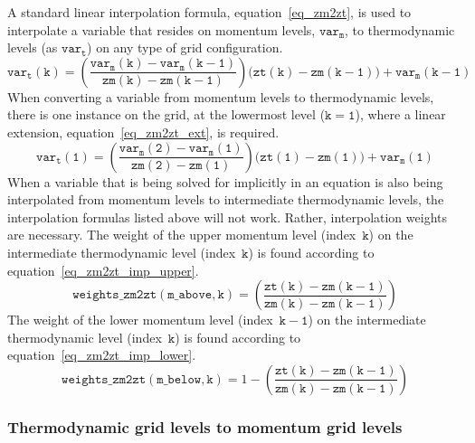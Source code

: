 \documentclass[11pt,fleqn]{article}
\begin{document}
A standard linear interpolation formula, equation~\ref{eq_zm2zt}, is used to 
interpolate a variable that resides on momentum levels, $\mathtt{var_m}$, to 
thermodynamic levels (as $\mathtt{var_t}$) on any type of grid configuration.
\begin{equation}
\label{eq_zm2zt}
\mathtt{var_t(k)}
   = \left( \frac{ \mathtt{var_m(k)} - \mathtt{var_m(k-1)} }
                 { \mathtt{zm(k)} - \mathtt{zm(k-1)} } \right)
     \Big( \mathtt{zt(k)} - \mathtt{zm(k-1)} \Big)
     + \mathtt{var_m(k-1)}
\end{equation}
When converting a variable from momentum levels to thermodynamic levels, there
is one instance on the grid, at the lowermost level ($\mathtt{k=1}$), where 
a linear extension, equation~\ref{eq_zm2zt_ext}, is required.
\begin{equation}
\label{eq_zm2zt_ext}
\mathtt{var_t(1)}
   = \left( \frac{ \mathtt{var_m(2)} - \mathtt{var_m(1)} }
                 { \mathtt{zm(2)} - \mathtt{zm(1)} } \right)
     \Big( \mathtt{zt(1)} - \mathtt{zm(1)} \Big)
     + \mathtt{var_m(1)}
\end{equation}
When a variable that is being solved for implicitly in an equation is also being
interpolated from momentum levels to intermediate thermodynamic levels, the 
interpolation formulas listed above will not work.  Rather, interpolation 
weights are necessary.  The weight of the upper momentum level 
(index~$\mathtt{k}$) on the intermediate thermodynamic level 
(index~$\mathtt{k}$) is found according to equation~\ref{eq_zm2zt_imp_upper}.
\begin{equation}
\label{eq_zm2zt_imp_upper}
\mathtt{weights\_zm2zt(m\_above,k)}
   = \left( \frac{ \mathtt{zt(k)} - \mathtt{zm(k-1)} }
                 { \mathtt{zm(k)} - \mathtt{zm(k-1)} } \right)
\end{equation}
The weight of the lower momentum level (index~$\mathtt{k-1}$) on the
intermediate thermodynamic level (index~$\mathtt{k}$) is found according to
equation~\ref{eq_zm2zt_imp_lower}.
\begin{equation}
\label{eq_zm2zt_imp_lower}
\mathtt{weights\_zm2zt(m\_below,k)}
   = 1 - \left( \frac{ \mathtt{zt(k)} - \mathtt{zm(k-1)} }
                     { \mathtt{zm(k)} - \mathtt{zm(k-1)} } \right)
\end{equation}

\subsubsection{Thermodynamic grid levels to momentum grid levels}
\end{document}
